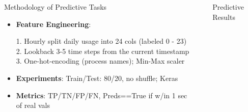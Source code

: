 \documentclass[final]{beamer}
\newlength{\sepwidth}
\newlength{\colwidth}
\newcommand{\separatorcolumn}{\begin{column}{\sepwidth}\end{column}}
\begin{document}
\begin{frame}[t]
\begin{columns}[t]
\begin{column}{\colwidth}
\begin{exampleblock}{\huge{Methodology of Predictive Tasks}}
{\begin{itemize}
            \item \textbf{Feature Engineering}:

                  1. Hourly split daily usage into 24 cols (labeled 0 - 23)\\
                  2. Lookback 3-5 time steps from the current timestamp\\
                  3. One-hot-encoding (process names); Min-Max scaler
            \item \textbf{Experiments}: Train/Test: 80/20, no shuffle; Keras

                 \item \textbf{Metrics}: TP/TN/FP/FN, Preds==True if w/in 1 sec of real vals

          \end{itemize} }
      \end{exampleblock}

    \end{column}

    \separatorcolumn

    \begin{column}{\colwidth}

      \begin{block}
        {\huge{Predictive Results}}


\end{block}
\end{column}
\end{columns}
\end{frame}
\end{document}

